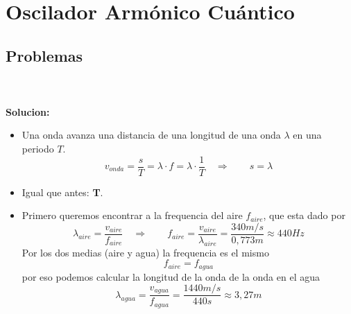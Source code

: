 \chapter{Oscilador Armónico Cuántico}

\section{Problemas}

 \\\\
\textbf{Solucion:} \\
\begin{itemize}
	\item Una onda avanza una distancia de una longitud de una onda
\textbf{$\lambda$} en una periodo \textbf{$T$}. 
	$$
		v_{onda} = \frac{s}{T} = \lambda \cdot f = \lambda \cdot \frac{1}{T}  \quad
\Rightarrow \qquad s = \lambda
	$$
	\item Igual que antes: \textbf{T}.
	\item Primero queremos encontrar a la frequencia del aire $f_{aire}$, que
esta dado por
	$$
		\lambda_{aire} = \frac{v_{aire}}{f_{aire}} \quad \Rightarrow \qquad f_{aire} =
\frac{v_{aire}}{\lambda_{aire}} = \frac{340 m/s}{0,773m} \approx 440 Hz
	$$
	Por los dos medias (aire y agua) la frequencia es el mismo
	$$
		f_{aire} = f_{agua}
	$$
	por eso podemos calcular la longitud de la onda de la onda en el agua
	$$
		\lambda_{agua} = \frac{v_{agua}}{f_{agua}} = \frac{1440 m/s}{440 s}
\approx 3,27 m
	$$
\end{itemize}

